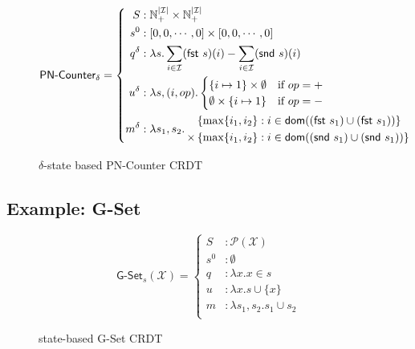 \begin{figure}[H]
  \[
    \textsf{PN-Counter}_\delta = \left\{\begin{aligned}
      S &: \mathbb{N}_+^{|\mathcal{I}|} \times \mathbb{N}_+^{|\mathcal{I}|} \\
      s^0 &: \left[ 0, 0, \cdots, 0 \right] \times \left[ 0, 0, \cdots, 0 \right] \\
      q^\delta &: \lambda s. \sum_{i \in \mathcal{I}} (\textsf{fst}~s)(i) - \sum_{i \in
        \mathcal{I}} (\textsf{snd}~s)(i) \\
      u^\delta &: \lambda s,(i,op). \begin{cases}
             \{ i \mapsto 1 \} \times \emptyset & \text{if $op=+$} \\
             \emptyset \times \{ i \mapsto 1 \} & \text{if $op=-$} \\
           \end{cases} \\
      m^\delta &: \lambda s_1, s_2.\, \begin{aligned}
             &\left\{ \max\{ i_1, i_2 \} : i \in \mathsf{dom}((\textsf{fst}~s_1) \cup (\textsf{fst}~s_1)) \right\} \\
             \times &\left\{ \max\{ i_1, i_2 \} : i \in \mathsf{dom}((\textsf{snd}~s_1) \cup (\textsf{snd}~s_1)) \right\}
           \end{aligned}
    \end{aligned}\right.
  \]
  \caption{$\delta$-state based \textsf{PN-Counter} CRDT}
\end{figure}


\subsection{Example: G-Set}
\label{sec:example-gset}


\begin{figure}[H]
  \centering
  \[
    \textsf{G-Set}_s(\mathcal{X}) = \left\{\begin{aligned}
      S &: \mathcal{P}(\mathcal{X}) \\
      s^0 &: \emptyset \\
      q &: \lambda x. x \in s \\
      u &: \lambda x. s \cup \{ x \} \\
      m &: \lambda s_1, s_2. s_1 \cup s_2 \\
    \end{aligned}\right.
  \]
  \caption{state-based \textsf{G-Set} CRDT}
\end{figure}

